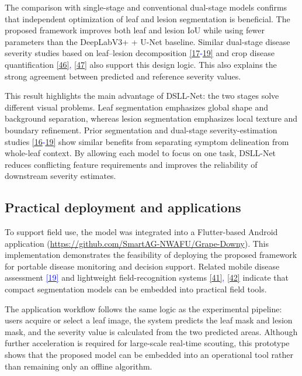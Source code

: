 \documentclass[
]{article}
\begin{document}
The comparison with single-stage and conventional dual-stage models
confirms that independent optimization of leaf and lesion segmentation is
beneficial. The proposed framework improves both leaf and lesion IoU
while using fewer parameters than the DeepLabV3+ + U-Net baseline. Similar
dual-stage disease severity studies based on leaf--lesion decomposition
\textcolor{blue}{\hyperlink{ref:17}{[17}-\hyperlink{ref:19}{19]}} and
crop disease quantification \textcolor{blue}{\hyperlink{ref:46}{[46]},
\hyperlink{ref:47}{[47]}} also support this design logic. This also
explains the strong agreement between predicted and reference severity
values.

This result highlights the main advantage of DSLL-Net: the two stages
solve different visual problems. Leaf segmentation emphasizes global
shape and background separation, whereas lesion segmentation emphasizes
local texture and boundary refinement. Prior segmentation and dual-stage
severity-estimation studies \textcolor{blue}{\hyperlink{ref:16}{[16}-\hyperlink{ref:19}{19]}}
show similar benefits from separating symptom delineation from whole-leaf
context. By allowing each model to focus on one task, DSLL-Net reduces
conflicting feature requirements and improves the reliability of
downstream severity estimates.

\hypertarget{practical-deployment-and-applications}{%
\subsection{Practical deployment and
applications}\label{practical-deployment-and-applications}}

To support field use, the model was integrated into a Flutter-based
Android application (\url{https://github.com/SmartAG-NWAFU/Grape-Downy}).
This implementation demonstrates the feasibility of deploying the
proposed framework for portable disease monitoring and decision support.
Related mobile disease assessment \hyperlink{ref:19}{\textcolor{blue}{[19]}}
and lightweight field-recognition systems
\textcolor{blue}{\hyperlink{ref:41}{[41]}, \hyperlink{ref:42}{[42]}} indicate
that compact segmentation models can be embedded into practical field
tools.

The application workflow follows the same logic as the experimental
pipeline: users acquire or select a leaf image, the system predicts the
leaf mask and lesion mask, and the severity value is calculated from the
two predicted areas. Although further acceleration is required for
large-scale real-time scouting, this prototype shows that the proposed
model can be embedded into an operational tool rather than remaining
only an offline algorithm.
\end{document}
